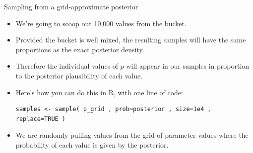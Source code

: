 \documentclass[handout]{beamer}
\begin{document}
\begin{frame}[fragile]{Sampling from a grid-approximate posterior}
\scriptsize{
\begin{itemize}

\item We’re going to scoop out 10,000 values from the bucket.

\item Provided the bucket is well mixed, the resulting samples will have the same proportions as the exact posterior density. 

\item Therefore the individual values of $p$ will appear in our samples in proportion to the posterior plausibility of each value.

\item Here’s how you can do this in R, with one line of code:

\begin{verbatim}
samples <- sample( p_grid , prob=posterior , size=1e4 , 
replace=TRUE )
\end{verbatim}
\item We are randomly pulling values from the grid of parameter values where the probability of each value is given by the posterior.

 
\end{itemize}



} 

\end{frame}
\end{document}
